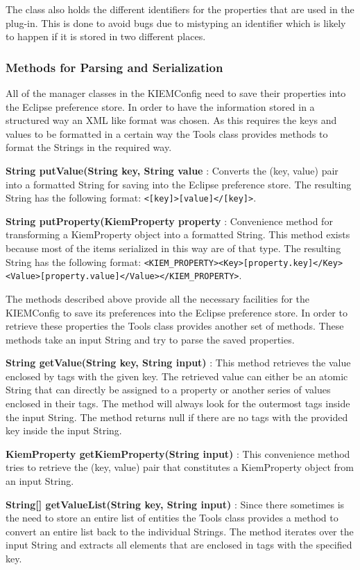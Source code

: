 The class also holds the different identifiers for the properties that are used in the plug-in. This is done
to avoid bugs due to mistyping an identifier which is likely to happen if it is stored in two different places.

\subsubsection{Methods for Parsing and Serialization}
\label{section:ToolsMethodsParsing}
All of the manager classes in the \ac{KIEMConfig} need to save their properties into the Eclipse preference store.
In order to have the information stored in a structured way an XML like format was chosen. As this requires the keys and values
to be formatted in a certain way the Tools class provides methods to format the Strings in the required way.
\lstset{
backgroundcolor=,
}
\begin{description}
 \item \textbf{String putValue(String key, String value} : Converts the (key, value) pair into a formatted String for saving
into the Eclipse preference store. The resulting String has the following format: 
\lstinline|<[key]>[value]</[key]>|.
 \item \textbf{String putProperty(KiemProperty property} : Convenience method for transforming a KiemProperty object into a
formatted String. This method exists because most of the items serialized in this way are of that type. The resulting String
has the following format: \lstinline|<KIEM_PROPERTY><Key>[property.key]</Key><Value>[property.value]</Value></KIEM_PROPERTY>|.
\end{description}

The methods described above provide all the necessary facilities for the \ac{KIEMConfig} to save its preferences
into the Eclipse preference store. In order to retrieve these properties the Tools class provides another set of
methods. These methods take an input String and try to parse the saved properties.
\begin{description}
 \item \textbf{String getValue(String key, String input)} : This method retrieves the value enclosed by tags with
the given key. The retrieved value can either be an atomic String that can directly be assigned to a property or
another series of values enclosed in their tags. The method will always look for the outermost tags inside the
input String. The method returns null if there are no tags with the provided key inside the input String.
 \item \textbf{KiemProperty getKiemProperty(String input)} : This convenience method tries to retrieve the 
(key, value) pair that constitutes a KiemProperty object from an input String.
 \item \textbf{String[] getValueList(String key, String input)} : Since there sometimes is the need to store an entire
list of entities the Tools class provides a method to convert an entire list back to the individual Strings.
The method iterates over the input String and extracts all elements that are enclosed in tags with the specified key.
\end{description}



